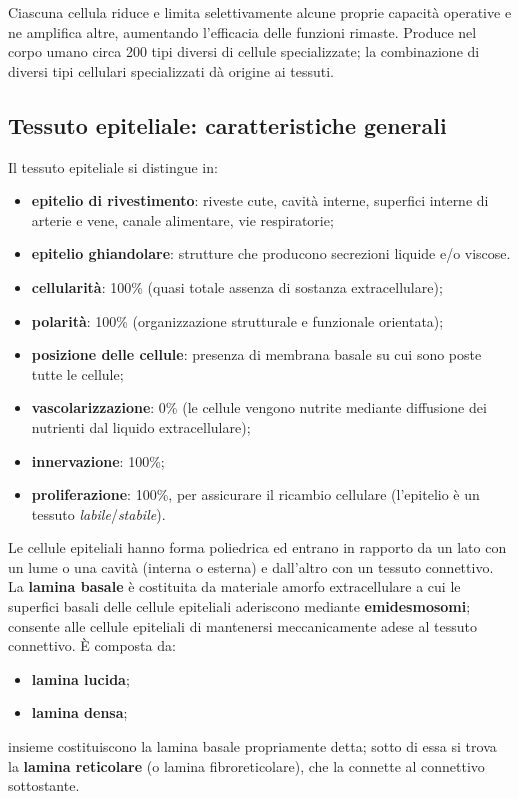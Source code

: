 Ciascuna cellula riduce e limita selettivamente alcune proprie capacità operative e ne amplifica altre, aumentando l'efficacia delle funzioni rimaste. Produce nel corpo umano circa 200 tipi diversi di cellule specializzate; la combinazione di diversi tipi cellulari specializzati dà origine ai tessuti.

\subsection{Tessuto epiteliale: caratteristiche generali}

Il tessuto epiteliale si distingue in:
\begin{itemize}
  \item \textbf{epitelio di rivestimento}: riveste cute, cavità interne, superfici interne di arterie e vene, canale alimentare, vie respiratorie;
  \item \textbf{epitelio ghiandolare}: strutture che producono secrezioni liquide e/o viscose.
\end{itemize}

\begin{itemize}
  \item \textbf{cellularità}: 100\% (quasi totale assenza di sostanza extracellulare);
  \item \textbf{polarità}: 100\% (organizzazione strutturale e funzionale orientata);
  \item \textbf{posizione delle cellule}: presenza di membrana basale su cui sono poste tutte le cellule;
  \item \textbf{vascolarizzazione}: 0\% (le cellule vengono nutrite mediante diffusione dei nutrienti dal liquido extracellulare);
  \item \textbf{innervazione}: 100\%;
  \item \textbf{proliferazione}: 100\%, per assicurare il ricambio cellulare (l'epitelio è un tessuto \textit{labile}/\textit{stabile}).
\end{itemize}

Le cellule epiteliali hanno forma poliedrica ed entrano in rapporto da un lato con un lume o una cavità (interna o esterna) e dall'altro con un tessuto connettivo. La \textbf{lamina basale} è costituita da materiale amorfo extracellulare a cui le superfici basali delle cellule epiteliali aderiscono mediante \textbf{emidesmosomi}; consente alle cellule epiteliali di mantenersi meccanicamente adese al tessuto connettivo. È composta da:
\begin{itemize}
  \item \textbf{lamina lucida};
  \item \textbf{lamina densa};
\end{itemize}
insieme costituiscono la lamina basale propriamente detta; sotto di essa si trova la \textbf{lamina reticolare} (o lamina fibroreticolare), che la connette al connettivo sottostante.

